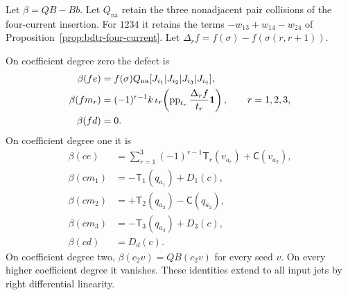 Let $\beta=QB-Bb$.
Let $Q_{\mathrm{na}}$ retain the three nonadjacent pair collisions of the four-current insertion.
For $1234$ it retains the terms $-w_{13}+w_{14}-w_{24}$ of Proposition~\ref{prop:bdtr-four-current}.
Let $\Delta_rf=f(\sigma)-f(\sigma(r,r+1))$.

\begin{proposition}\label{prop:bdfour-defect}
On coefficient degree zero the defect is
\begin{equation}\label{eq:bdfour-defect-zero}
 \begin{aligned}
 \beta(fe)&=f(\sigma)Q_{\mathrm{na}}[J_{i_1}|J_{i_2}|J_{i_3}|J_{i_4}],\\
 \beta(fm_r)&=(-1)^{r-1}k\,
       \iota_r\!\left(\operatorname{pp}_{t_r}\frac{\Delta_rf}{t_r}\mathbf1\right),
       \qquad r=1,2,3,\\
 \beta(fd)&=0.
 \end{aligned}
\end{equation}
On coefficient degree one it is
\begin{equation}\label{eq:bdfour-defect-one}
 \begin{aligned}
 \beta(ce)&=\sum_{r=1}^3(-1)^{r-1}\mathsf T_r(v_{a_r})+\mathsf C(v_{a_2}),\\
 \beta(cm_1)&=-\mathsf T_1(q_{a_1})+D_1(c),\\
 \beta(cm_2)&=+\mathsf T_2(q_{a_2})-\mathsf C(q_{a_2}),\\
 \beta(cm_3)&=-\mathsf T_3(q_{a_3})+D_3(c),\\
 \beta(cd)&=D_d(c).
 \end{aligned}
\end{equation}
On coefficient degree two, $\beta(c_2v)=QB(c_2v)$ for every seed $v$.
On every higher coefficient degree it vanishes.
These identities extend to all input jets by right differential linearity.
\end{proposition}

